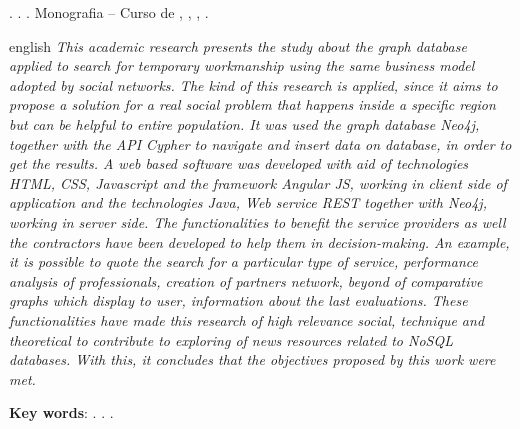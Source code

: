 
\begin{OnehalfSpacing} 

\noindent \imprimirAutorCitacaoMaiuscula. {\bfseries\imprimirtitulo}. {\imprimirdata}.  Monografia -- Curso de {\MakeUppercase\imprimircurso}, {\imprimirinstituicao}, {\imprimirlocal}, {\imprimirdata}.

\vspace{\onelineskip}
\vspace{\onelineskip}
\vspace{\onelineskip}
\vspace{\onelineskip}

\begin{resumo}[Abstract]%
\begin{otherlanguage*}{english}%
\textit{
\noindent This academic research presents the study about the graph database applied to search for temporary workmanship using the same business model adopted by social networks. The kind of this research is applied, since it aims to propose a solution for a real social problem that happens inside a specific region but can be helpful to entire population. It was used the graph database Neo4j, together with the API Cypher to navigate and insert data on database, in order to get the results. A web based software was developed with aid of technologies HTML, CSS, Javascript and the framework Angular JS, working in client side of application and the technologies Java, Web service REST together with Neo4j, working in server side. The functionalities to benefit the service providers as well the contractors have been developed to help them in decision-making. An example, it is possible to quote the search for a particular type of service, performance analysis of professionals, creation of partners network, beyond of comparative graphs which display to user, information about the last evaluations. These functionalities have made this research of high relevance social, technique and theoretical to contribute to exploring of news resources related to NoSQL databases. With this, it concludes that the objectives proposed by this work were met.
}

\vspace{\onelineskip}
\vspace*{\fill}
\noindent \textbf{Key words}: \imprimirKeyWordOne. \imprimirKeyWordTwo. \imprimirKeyWordThree.
\end{otherlanguage*}
\vspace{\onelineskip}
\end{resumo}

\end{OnehalfSpacing}

